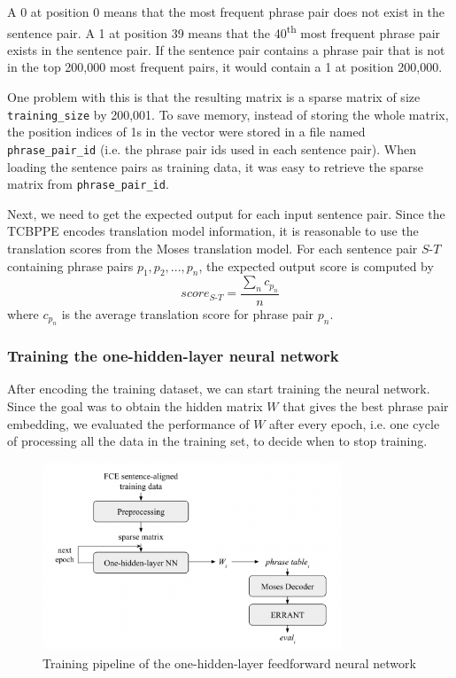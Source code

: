 \documentclass[12pt,a4paper,twoside]{report}
\begin{document}
A 0 at position 0 means that the most frequent phrase pair does not exist in the sentence pair. A 1 at position 39 means that the 40\textsuperscript{th} most frequent phrase pair exists in the sentence pair. If the sentence pair contains a phrase pair that is not in the top 200,000 most frequent pairs, it would contain a 1 at position 200,000.

One problem with this is that the resulting matrix is a sparse matrix of size \texttt{training\_size} by 200,001. To save memory, instead of storing the whole matrix, the position indices of 1s in the vector were stored in a file named \texttt{phrase\_pair\_id} (i.e. the phrase pair ids used in each sentence pair). When loading the sentence pairs as training data, it was easy to retrieve the sparse matrix from \texttt{phrase\_pair\_id}.

Next, we need to get the expected output for each input sentence pair. Since the TCBPPE encodes translation model information, it is reasonable to use the translation scores from the Moses translation model. For each sentence pair $S\textrm{-}T$ containing phrase pairs $p_1, p_2, ..., p_n$, the expected output score is computed by
\[ score_{S\textrm{-}T} = \frac{\sum_n c_{p_n}}{n} \]
where $c_{p_n}$ is the average translation score for phrase pair $p_n$.

\subsubsection{Training the one-hidden-layer neural network}
After encoding the training dataset, we can start training the neural network. Since the goal was to obtain the hidden matrix $W$ that gives the best phrase pair embedding, we evaluated the performance of $W$ after every epoch, i.e. one cycle of processing all the data in the training set, to decide when to stop training.

\begin{figure}[ht]
\centering
\includegraphics[width=0.8\textwidth]{images/sparse_pipeline.png}
\caption{Training pipeline of the one-hidden-layer feedforward neural network}
\label{fig:sparse_pipeline}
\end{figure}
\end{document}
